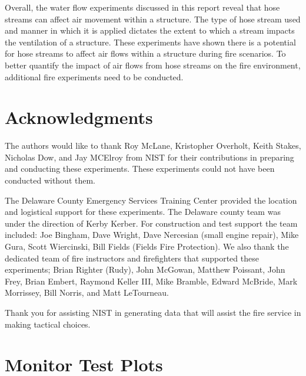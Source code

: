 \documentclass[12pt,oneside]{book}
\begin{document}
Overall, the water flow experiments discussed in this report reveal that hose streams can affect air movement within a structure. The type of hose stream used and manner in which it is applied dictates the extent to which a stream impacts the ventilation of a structure. These experiments have shown there is a potential for hose streams to affect air flows within a structure during fire scenarios. To better quantify the impact of air flows from hose streams on the fire environment, additional fire experiments need to be conducted.

\chapter{Acknowledgments}
\label{chap:acknowledgments}

The authors would like to thank Roy McLane, Kristopher Overholt, Keith Stakes, Nicholas Dow, and Jay MCElroy from NIST for their contributions in preparing and conducting these experiments. These experiments could not have been conducted without them.  

The Delaware County Emergency Services Training Center provided the location and logistical support for these experiments.  The Delaware county team was under the direction of Kerby Kerber.  For construction and test support the team included: Joe Bingham, Dave Wright, Dave Nercesian (small engine repair), Mike Gura, Scott Wiercinski, Bill Fields (Fields Fire Protection).  We also thank the dedicated team of fire instructors and firefighters that supported these experiments; Brian Righter (Rudy), John McGowan, Matthew Poissant, John Frey, Brian Embert, Raymond Keller III, Mike Bramble, Edward McBride, Mark Morrissey, Bill Norris, and Matt LeTourneau.

Thank you for assisting NIST in generating data that will assist the fire service in making tactical choices.





\appendix
\chapter{Monitor Test Plots}
\label{chap:monitor_plots}
\end{document}
